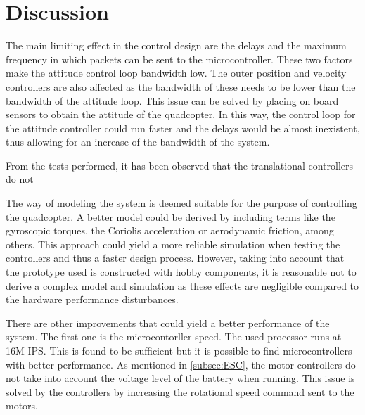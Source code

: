 \chapter{Discussion}
The main limiting effect in the control design are the delays and the maximum frequency in which packets can be sent to the microcontroller. These two factors make the attitude control loop bandwidth low. The outer position and velocity controllers are also affected as the bandwidth of these needs to be lower than the bandwidth of the attitude loop. This issue can be solved by placing on board sensors to obtain the attitude of the quadcopter. In this way, the control loop for the attitude controller could run faster and the delays would be almost inexistent, thus allowing for an increase of the bandwidth of the system.

From the tests performed, it has been observed that the translational controllers do not 

The way of modeling the system is deemed suitable for the purpose of controlling the quadcopter. A better model could be derived by including terms like the gyroscopic torques, the Coriolis acceleration or aerodynamic friction, among others. This approach could yield a more reliable simulation when testing the controllers and thus a faster design process. However, taking into account that the prototype used is constructed with hobby components, it is reasonable not to derive a complex model and simulation as these effects are negligible compared to the hardware performance disturbances. 

There are other improvements that could yield a better performance of the system. The first one is the microcontorller speed. The used processor runs at 16M IPS. This is found to be sufficient but it is possible to find microcontrollers with better performance. As mentioned in \autoref{subsec:ESC}, the motor controllers do not take into account the voltage level of the battery when running. This issue is solved by the controllers by increasing the rotational speed command sent to the motors.  




